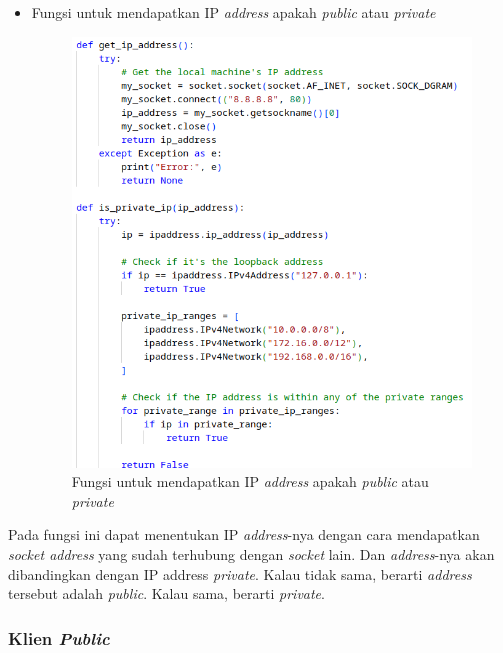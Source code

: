 \begin{itemize}
	\item{Fungsi untuk mendapatkan IP \emph{address} apakah \emph{public} atau \emph{private}}
	\begin{figure}[H]
		\centering{}
		\includegraphics[width=1\textwidth]{gambar/kode/potongan_client_00}
		\caption{Fungsi untuk mendapatkan IP \emph{address} apakah \emph{public} atau \emph{private}}
	\end{figure}
\end{itemize}
Pada fungsi ini dapat menentukan IP \emph{address}-nya dengan cara mendapatkan \emph{socket address} yang sudah terhubung dengan \emph{socket} lain. Dan \emph{address}-nya akan dibandingkan dengan IP address \emph{private}. Kalau tidak sama, berarti \emph{address} tersebut adalah \emph{public}. Kalau sama, berarti \emph{private}. 

\clearpage
\subsubsection{Klien \emph{Public}}

